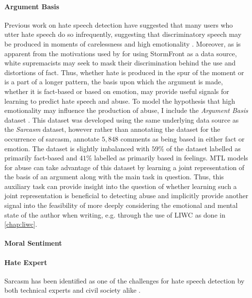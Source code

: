 \paragraph{Argument Basis}
Previous work on hate speech detection have suggested that many users who utter hate speech do so infrequently, suggesting that discriminatory speech may be produced in moments of carelessness and high emotionality \citep{Waseem:2016}. Moreover, as is apparent from the motivations used by \citet{Garcia:2019} for using StormFront as a data source, white supremacists may seek to mask their discrimination behind the use and distortions of fact. Thus, whether hate is produced in the spur of the moment or is a part of a longer pattern, the basis upon which the argument is made, whether it is fact-based or based on emotion, may provide useful signals for learning to predict hate speech and abuse.
To model the hypothesis that high emotionality may influence the production of abuse, I include the \textit{Argument Basis} dataset \citep{Oraby_factfeel:2015}.
This dataset was developed using the same underlying data source as the \textit{Sarcasm} dataset, however rather than annotating the dataset for the occurrence of sarcasm, \citet{Oraby_factfeel:2015} annotate $5,848$ comments as being based in either fact or emotion. 
The dataset is slightly imbalanced with $59\%$ of the dataset labelled as primarily fact-based and $41\%$ labelled as primarily based in feelings.
MTL models for abuse can take advantage of this dataset by learning a joint representation of the basis of an argument along with the main task in question.
Thus, this auxiliary task can provide insight into the question of whether learning such a joint representation is beneficial to detecting abuse and implicitly provide another signal into the feasibility of more deeply considering the emotional and mental state of the author when writing, e.g. through the use of LIWC as done in \cref{chap:liwc}.

\paragraph{Moral Sentiment}

\paragraph{Hate Expert}




Sarcasm has been identified as one of the challenges for hate speech detection by both technical experts and civil society alike \citep{Rottger:2021}.

